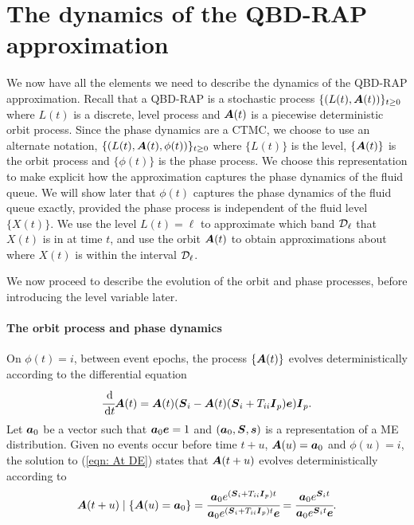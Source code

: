 \section{The dynamics of the QBD-RAP approximation}\label{sec: dynamics}
We now have all the elements we need to describe the dynamics of the QBD-RAP approximation. Recall that a QBD-RAP is a stochastic process \(\{(L(t),\boldsymbol A(t))\}_{t\geq0}\) where \(L(t)\) is a discrete, level process and \(\boldsymbol A(t)\) is a piecewise deterministic orbit process. Since the phase dynamics are a CTMC, we choose to use an alternate notation, \(\{(L(t),\boldsymbol A(t),\phi(t))\}_{t\geq0}\) where \(\{L(t)\}\) is the level, \(\{\boldsymbol A(t)\}\) is the orbit process and \(\{\phi(t)\}\) is the phase process. We choose this representation to make explicit how the approximation captures the phase dynamics of the fluid queue. We will show later that \(\phi(t)\) captures the phase dynamics of the fluid queue exactly, provided the phase process is independent of the fluid level \(\{X(t)\}\). We use the level \(L(t)=\ell\) to approximate which band \(\mathcal{D}_\ell\) that \(X(t)\) is in at time \(t\), and use the orbit \(\boldsymbol A(t)\) to obtain approximations about where \(X(t)\) is within the interval \(\mathcal{D}_\ell\). 

We now proceed to describe the evolution of the orbit and phase processes, before introducing the level variable later. 

\paragraph{The orbit process and phase dynamics} On \({\phi}(t)=i\), between event epochs, the process \(\{\boldsymbol A(t)\}\) evolves deterministically according to the differential equation 
\begin{align}\label{eqn: At DE}
\cfrac{\, \mathrm{d}}{\, \mathrm{d} t}\boldsymbol A(t) = \boldsymbol A(t)(\boldsymbol{S}_i - \boldsymbol A(t) (\boldsymbol{S}_i + T_{ii}\boldsymbol{I}_p)\boldsymbol e)\boldsymbol{I}_p.
\end{align}
Let \(\boldsymbol a_0\) be a vector such that \(\boldsymbol a_0\boldsymbol e = 1\) and \((\boldsymbol a_0,\boldsymbol{S},\boldsymbol s)\) is a representation of a ME distribution. Given no events occur before time \(t+u\), \(\boldsymbol A(u) = \boldsymbol a_0\) and \({\phi}(u)=i\), the solution to (\ref{eqn: At DE}) states that \(\boldsymbol A({t+u})\) evolves deterministically according to 
\[\boldsymbol A({t+u})\mid \left\{\boldsymbol A(u)=\boldsymbol a_0\right\} =  \cfrac{\boldsymbol a_0 e^{(\boldsymbol{S}_i+T_{ii}\boldsymbol{I}_p)t}}{\boldsymbol a_0 e^{(\boldsymbol{S}_i+T_{ii}\boldsymbol{I}_p)t} \boldsymbol e} = \cfrac{\boldsymbol a_0 e^{\boldsymbol{S}_i t}}{\boldsymbol a_0 e^{\boldsymbol{S}_i t} \boldsymbol e}.\] 

